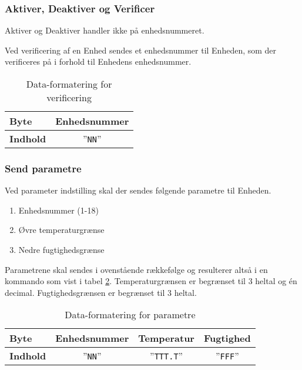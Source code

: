 
\subsubsection{Aktiver, Deaktiver og Verificer}

Aktiver og Deaktiver handler ikke på enhedsnummeret.

Ved verificering af en Enhed sendes et enhedsnummer til Enheden, som der verificeres på i forhold til Enhedens enhedsnummer.

\begin{table}[h]
	\caption{Data-formatering for verificering}
	\centering
	\begin{tabular}{|l|c|}
		\hline 
		\textbf{Byte} & \textbf{Enhedsnummer} \\ 
		\hline 
		\textbf{Indhold} & ''\verb+NN+''\\ 
		\hline 
	\end{tabular} 
	\label{table:SWProtokol-verificer}
\end{table}

\subsubsection{Send parametre}

Ved parameter indstilling skal der sendes følgende parametre til Enheden.

\begin{enumerate}
	\item Enhedsnummer (1-18)
	\item Øvre temperaturgrænse
	\item Nedre fugtighedsgrænse
\end{enumerate}

Parametrene skal sendes i ovenstående rækkefølge og resulterer altså i en kommando som vist i tabel \ref{table:SWProtokol-para}. Temperaturgrænsen er begrænset til 3 heltal og én decimal. Fugtighedsgrænsen er begrænset til 3 heltal.

\begin{table}[h]
	\caption{Data-formatering for parametre}
	\centering
	\begin{tabular}{|l|c|c|c|}
		\hline 
		\textbf{Byte} & \textbf{Enhedsnummer} & \textbf{Temperatur} & \textbf{Fugtighed} \\ 
		\hline 
		\textbf{Indhold} & ''\verb+NN+'' & ''\verb+TTT.T+'' & ''\verb+FFF+''  \\ 
		\hline 
	\end{tabular} 
	\label{table:SWProtokol-para}
\end{table}

